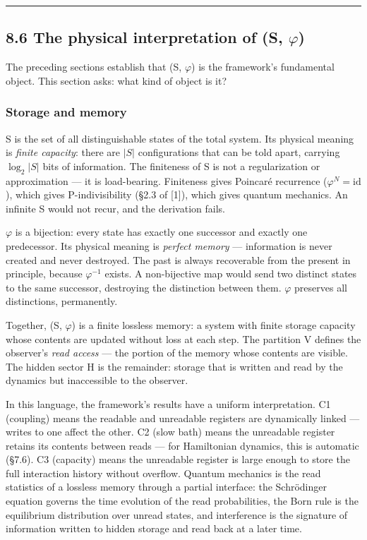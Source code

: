 \documentclass[
  11pt,
]{article}
\begin{document}
\begin{center}\rule{0.5\linewidth}{0.5pt}\end{center}

\hypertarget{the-physical-interpretation-of-s-varphi}{%
\subsection{\texorpdfstring{8.6 The physical interpretation of (S,
\(\varphi\))}{8.6 The physical interpretation of (S, \textbackslash varphi)}}\label{the-physical-interpretation-of-s-varphi}}

The preceding sections establish that (S, \(\varphi\)) is the
framework's fundamental object. This section asks: what kind of object
is it?

\hypertarget{storage-and-memory}{%
\subsubsection{Storage and memory}\label{storage-and-memory}}

S is the set of all distinguishable states of the total system. Its
physical meaning is \emph{finite capacity}: there are \(|S|\)
configurations that can be told apart, carrying \(\log_2 |S|\) bits of
information. The finiteness of S is not a regularization or
approximation --- it is load-bearing. Finiteness gives Poincaré
recurrence (\(\varphi^N = \mathrm{id}\)), which gives P-indivisibility
(§2.3 of {[}1{]}), which gives quantum mechanics. An infinite S would
not recur, and the derivation fails.

\(\varphi\) is a bijection: every state has exactly one successor and
exactly one predecessor. Its physical meaning is \emph{perfect memory}
--- information is never created and never destroyed. The past is always
recoverable from the present in principle, because \(\varphi^{-1}\)
exists. A non-bijective map would send two distinct states to the same
successor, destroying the distinction between them. \(\varphi\)
preserves all distinctions, permanently.

Together, (S, \(\varphi\)) is a finite lossless memory: a system with
finite storage capacity whose contents are updated without loss at each
step. The partition V defines the observer's \emph{read access} --- the
portion of the memory whose contents are visible. The hidden sector H is
the remainder: storage that is written and read by the dynamics but
inaccessible to the observer.

In this language, the framework's results have a uniform interpretation.
C1 (coupling) means the readable and unreadable registers are
dynamically linked --- writes to one affect the other. C2 (slow bath)
means the unreadable register retains its contents between reads --- for
Hamiltonian dynamics, this is automatic (§7.6). C3 (capacity) means the
unreadable register is large enough to store the full interaction
history without overflow. Quantum mechanics is the read statistics of a
lossless memory through a partial interface: the Schrödinger equation
governs the time evolution of the read probabilities, the Born rule is
the equilibrium distribution over unread states, and interference is the
signature of information written to hidden storage and read back at a
later time.
\end{document}
